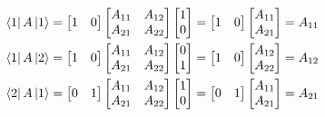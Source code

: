 \documentclass[../../../main.tex]{subfiles}
\begin{document}
\begin{align*}
	\bra{1}A \ket{1} & =
	\begin{bmatrix}
		1 & 0
	\end{bmatrix}
	\begin{bmatrix}
		A_{11} & A_{12} \\
		A_{21} & A_{22}
	\end{bmatrix}
	\begin{bmatrix}
		1 \\
		0
	\end{bmatrix}
	=
	\begin{bmatrix}
		1 & 0
	\end{bmatrix}
	\begin{bmatrix}
		A_{11} \\
		A_{21}
	\end{bmatrix}
	=A_{11}              \\
	\bra{1}A \ket{2} & =
	\begin{bmatrix}
		1 & 0
	\end{bmatrix}
	\begin{bmatrix}
		A_{11} & A_{12} \\
		A_{21} & A_{22}
	\end{bmatrix}
	\begin{bmatrix}
		0 \\
		1
	\end{bmatrix}
	=
	\begin{bmatrix}
		1 & 0
	\end{bmatrix}
	\begin{bmatrix}
		A_{12} \\
		A_{22}
	\end{bmatrix}
	=A_{12}              \\
	\bra{2}A \ket{1} & =
	\begin{bmatrix}
		0 & 1
	\end{bmatrix}
	\begin{bmatrix}
		A_{11} & A_{12} \\
		A_{21} & A_{22}
	\end{bmatrix}
	\begin{bmatrix}
		1 \\
		0
	\end{bmatrix}
	=
	\begin{bmatrix}
		0 & 1
	\end{bmatrix}
	\begin{bmatrix}
		A_{11} \\
		A_{21}
	\end{bmatrix}
	=A_{21}              \\

\end{align*}
\end{document}

